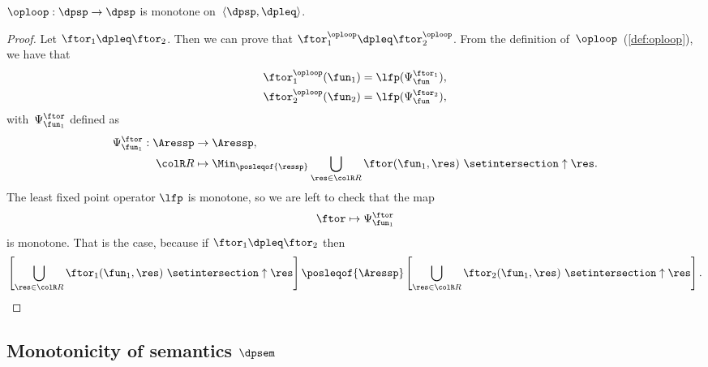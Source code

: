\begin{lemma}
	\label{lem:loop-monotone}$\oploop:\dpsp\rightarrow\dpsp$ is monotone
	on~$\langle\dpsp,\dpleq\rangle$.
\end{lemma}
\begin{proof}
	Let $\ftor_{1}\dpleq\ftor_{2}$.
	Then we can prove that $\ftor_{1}^{\oploop}\dpleq\ftor_{2}^{\oploop}$.
	From the definition of~$\oploop$~(\cref{def:oploop}), we
	have that
	\begin{align*}
		\ftor_{1}^{\oploop}(\fun_{1}) & =\lfp(\Psi_{\fun}^{\ftor_{1}}), \\
		\ftor_{2}^{\oploop}(\fun_{2}) & =\lfp(\Psi_{\fun}^{\ftor_{2}}),
	\end{align*}
	with~$\Psi_{\fun_{1}}^{\ftor}$ defined as
	\begin{align*}
		\Psi_{\fun_{1}}^{\ftor}:\Aressp & \rightarrow\Aressp,                                                                                          \\
		{\colR R}                       & \mapsto\Min_{\posleqof{\ressp}}\bigcup_{\res\in{\colR R}}\ftor(\fun_{1},\res)\ \setintersection\uparrow\res.
	\end{align*}
	The least fixed point operator $\lfp$ is monotone, so we are left
	to check that the map
	\[
		\ftor\mapsto\Psi_{\fun_{1}}^{\ftor}
	\]
	is monotone.
	That is the case, because if $\ftor_{1}\dpleq\ftor_{2}$
	then
	\[
		\left[\bigcup_{\res\in{\colR R}}\ftor_{1}(\fun_{1},\res)\ \setintersection\uparrow\res\right]\posleqof{\Aressp}\left[\bigcup_{\res\in{\colR R}}\ftor_{2}(\fun_{1},\res)\ \setintersection\uparrow\res\right].
	\]
\end{proof}

\subsection{Monotonicity of semantics $\dpsem$}

